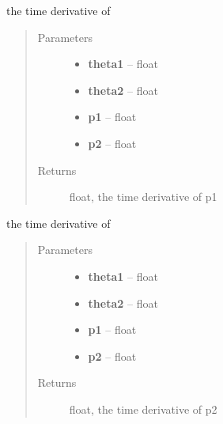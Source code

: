 \documentclass[letterpaper,10pt,english]{sphinxmanual}
\begin{document}
\begin{fulllineitems}
\label{index:doublePendulum.dp1}
the time derivative of 
\begin{quote}\begin{description}
\item[{Parameters}] \leavevmode\begin{itemize}
\item {} 
\textbf{theta1} -- float

\item {} 
\textbf{theta2} -- float

\item {} 
\textbf{p1} -- float

\item {} 
\textbf{p2} -- float

\end{itemize}

\item[{Returns}] \leavevmode
float, the time derivative of p1

\end{description}\end{quote}

\end{fulllineitems}


\begin{fulllineitems}
\label{index:doublePendulum.dp2}
the time derivative of 
\begin{quote}\begin{description}
\item[{Parameters}] \leavevmode\begin{itemize}
\item {} 
\textbf{theta1} -- float

\item {} 
\textbf{theta2} -- float

\item {} 
\textbf{p1} -- float

\item {} 
\textbf{p2} -- float

\end{itemize}

\item[{Returns}] \leavevmode
float, the time derivative of p2

\end{description}\end{quote}

\end{fulllineitems}
\end{document}
